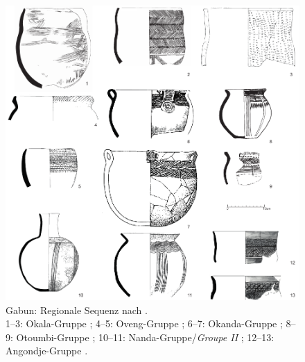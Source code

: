 \begin{figure}[!tb]
	\centering
	\includegraphics[width = \textwidth]{fig/Gabun_Typen.pdf}
	\caption{Gabun: Regionale Sequenz nach \textcite{Clist.20042005}.\\ 1--3: Okala-Gruppe \parencites[280 Abb.~6-71.2, 322 Abb.~6-105]{Clist.20042005}[187 Taf.~17.2]{Eggert.2016}; 4--5: Oveng-Gruppe \parencite[569 Abb.~7-25.1--2]{Clist.20042005}; 6--7: Okanda-Gruppe \parencites[355 Taf.~31.1]{AssokoNdong.20002001}[534 Abb.~6-230]{Clist.20042005}; 8--9: Otoumbi-Gruppe \parencite[626 Abb.~7-76.1, 7-76.3]{Clist.20042005}; 10--11: Nanda-Gruppe/\textit{Groupe II} \parencite[605 Abb.~7-49.2, 608 Abb.~7-52.2]{Clist.20042005}; 12--13: Angondje-Gruppe \parencite[224 Abb.~6-43]{SanchezElipe.2015}.}
	\label{fig:Gabon_Sequence}
\end{figure}


